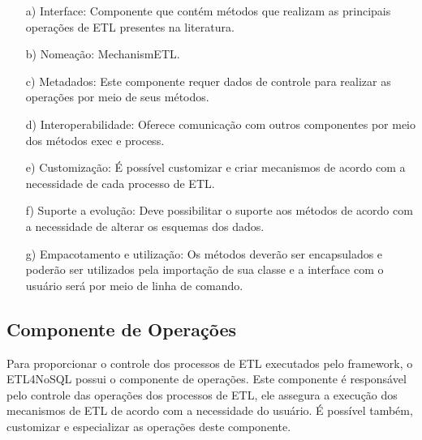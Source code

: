 \begin{itemize}
	\item[a)] Interface: Componente que contém métodos que realizam as principais operações de ETL presentes na literatura. 
	
	\item[b)] Nomeação: MechanismETL.
	
	\item[c)] Metadados: Este componente requer dados de controle para realizar as operações por meio de seus métodos.
	
	\item[d)] Interoperabilidade: Oferece comunicação com outros componentes por meio dos métodos exec e process.
	
	
	
	\item[e)] Customização: É possível customizar e criar mecanismos de acordo com a necessidade de cada processo de ETL.
	
	\item[f)] Suporte a evolução: Deve possibilitar o suporte aos métodos de acordo com a necessidade de alterar os esquemas dos dados.
	
	\item[g)] Empacotamento e utilização: Os métodos deverão ser encapsulados e poderão ser utilizados pela importação de sua classe e a interface com o usuário será por meio de linha de comando.
	
\end{itemize}

\subsection{Componente de Operações}

Para proporcionar o controle dos processos de ETL executados pelo framework, o ETL4NoSQL possui o componente de operações. Este componente é responsável pelo controle das operações dos processos de ETL, ele assegura a execução dos mecanismos de ETL de acordo com a necessidade do usuário. É possível também, customizar e especializar as operações deste componente.

